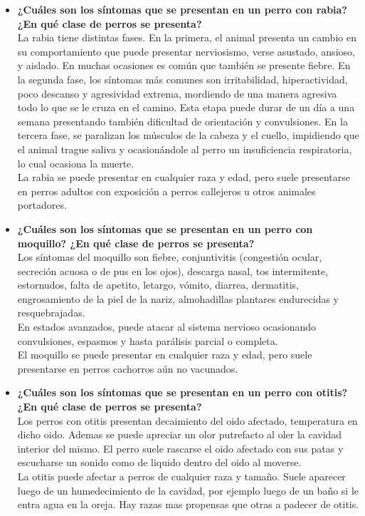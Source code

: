 \documentclass[a4paper,table,xcdraw]{article}
\begin{document}
\begin{itemize}
    \item \textbf{¿Cuáles son los síntomas que se presentan en un perro con rabia? ¿En qué clase de perros se presenta?}\\
    La rabia tiene distintas fases. En la primera, el animal presenta un cambio en su comportamiento que puede presentar nerviosismo, verse asustado, ansioso, y aislado. En muchas ocasiones es común que también se presente fiebre. En la segunda fase, los síntomas más comunes son irritabilidad, hiperactividad, poco descanso y agresividad extrema, mordiendo de una manera agresiva todo lo que se le cruza en el camino. Esta etapa puede durar de un día a una semana presentando también dificultad de orientación y convulsiones. En la tercera fase, se paralizan los músculos de la cabeza y el cuello, impidiendo que el animal trague saliva y ocasionándole al perro un insuficiencia respiratoria, lo cual ocasiona la muerte.\\
    La rabia se puede presentar en cualquier raza y edad, pero suele presentarse en perros adultos con exposición a perros callejeros u otros animales portadores.
    \item \textbf{¿Cuáles son los síntomas que se presentan en un perro con moquillo? ¿En qué clase de perros se presenta?}\\
    Los síntomas del moquillo son fiebre, conjuntivitis (congestión ocular, secreción acuosa o de pus en los ojos), descarga nasal, tos intermitente, estornudos, falta de apetito, letargo, vómito, diarrea, dermatitis, engrosamiento de la piel de la nariz, almohadillas plantares endurecidas y resquebrajadas.\\
    En estados avanzados, puede atacar al sistema nervioso ocasionando convulsiones, espasmos y hasta parálisis parcial o completa.\\
    El moquillo se puede presentar en cualquier raza y edad, pero suele presentarse en perros cachorros aún no vacunados.
    \item \textbf{¿Cuáles son los síntomas que se presentan en un perro con otitis? ¿En qué clase de perros se presenta?}\\
    Los perros con otitis presentan decaimiento del oido afectado, temperatura en dicho oido. Ademas se puede apreciar un olor putrefacto al oler la cavidad interior del mismo. El perro suele rascarse el oido afectado con sus patas y escucharse un sonido como de liquido dentro del oido al moverse.\\
    La otitis puede afectar a perros de cualquier raza y tamaño. Suele aparecer luego de un humedecimiento de la cavidad, por ejemplo luego de un baño si le entra agua en la oreja. Hay razas mas propensas que otras a padecer de otitis.

\end{itemize}
\end{document}
